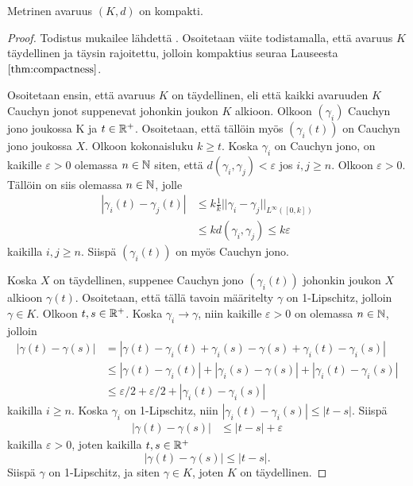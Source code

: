 \documentclass[12pt,oneside,a4paper]{amsbook} %
\begin{document}
\begin{theorem}\label{le:compactnessOfK}
    Metrinen avaruus $(K, d)$ on kompakti.
\end{theorem}
\begin{proof}
    Todistus mukailee lähdettä \cite[s. 26]{optimal}. 
    Osoitetaan väite todistamalla, että avaruus $K$ täydellinen ja täysin rajoitettu, jolloin kompaktius seuraa Lauseesta $\ref{thm:compactness}$.
    
    Osoitetaan ensin, että avaruus $K$ on täydellinen, eli että kaikki avaruuden $K$ Cauchyn jonot suppenevat johonkin joukon $K$ alkioon. Olkoon $(\gamma_i)$ Cauchyn jono joukossa K ja $t\in {\mathbb{R}^{+}}$. Osoitetaan, että tällöin myös $(\gamma_i(t))$ on Cauchyn jono joukossa $X$. Olkoon kokonaisluku $k \ge t$. Koska $\gamma_i$ on Cauchyn jono, on kaikille $\varepsilon > 0$ olemassa $n \in \mathbb{N}$ siten, että $d(\gamma_i, \gamma_j) < \varepsilon$ jos $i, j \ge n$. Olkoon $\varepsilon > 0$. Tällöin on siis olemassa $n \in \mathbb{N}$, jolle
    \begin{align*}
        |\gamma_i(t)-\gamma_j(t)| &\le k\frac{1}{k} ||\gamma_i - \gamma_j||_{L^\infty{([0,k])}} \\ 
        &\le k d(\gamma_i, \gamma_j) \le k\varepsilon
    \end{align*}
    kaikilla $i, j \ge n$. Siispä $(\gamma_i(t))$ on myös Cauchyn jono.
    
    Koska $X$ on täydellinen, suppenee Cauchyn jono $(\gamma_i(t))$ johonkin joukon $X$ alkioon $\gamma(t)$. Osoitetaan, että tällä tavoin määritelty $\gamma$ on 1-Lipschitz, jolloin $\gamma \in K$. Olkoon $t, s \in {\mathbb{R}^{+}}$. Koska $\gamma_i \to \gamma$, niin kaikille $\varepsilon > 0$ on olemassa $n\in \mathbb{N}$, jolloin
    \begin{align*}
        |\gamma(t) - \gamma(s)| &= |\gamma(t) - \gamma_i(t) + \gamma_i(s) - \gamma(s) + \gamma_i(t) - \gamma_i(s)| \\
        &\le  |\gamma(t) - \gamma_i(t)| + |\gamma_i(s) - \gamma(s)| + |\gamma_i(t) - \gamma_i(s)| \\
        &\le \varepsilon/2 + \varepsilon/2 + |\gamma_i(t) - \gamma_i(s)|
    \end{align*}
    kaikilla $i \ge n$. Koska $\gamma_i$ on 1-Lipschitz, niin $|\gamma_i(t) - \gamma_i(s)| \le |t-s|$. Siispä
    \begin{align*}
        |\gamma(t) - \gamma(s)| &\le |t-s| + \varepsilon
    \end{align*}
    kaikilla $\varepsilon > 0$, joten kaikilla $t,s \in {\mathbb{R}^{+}}$
    \begin{equation*}
        |\gamma(t)-\gamma(s)| \le |t-s|.
    \end{equation*}
    Siispä $\gamma$ on 1-Lipschitz, ja siten $\gamma \in K$, joten $K$ on täydellinen.
    

\end{proof}
\end{document}
